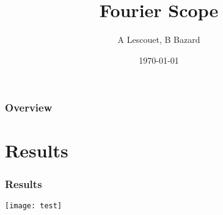 \documentclass{beamer}
\title[Fourier Scope]{Fourier Scope}
\author{A Lescouet, B Bazard}
\institute[T\'el\'ecom SudParis]{
  T\'el\'ecom Sudparis\\
}
\date{\today}
\begin{document}
\begin{frame}
  \titlepage%
\end{frame}

\begin{frame}%
  \frametitle{Overview}
  \tableofcontents
\end{frame}

\section{Results}

\begin{frame}
  \frametitle{Results}
  \begin{center}
    \texttt{[image: test]}%
  \end{center}
\end{frame}
\end{document}
